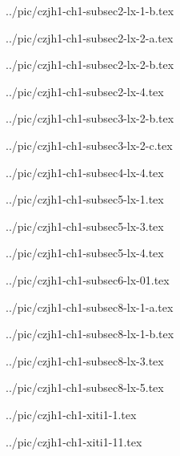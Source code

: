 ../pic/czjh1-ch1-subsec2-lx-1-b.tex



../pic/czjh1-ch1-subsec2-lx-2-a.tex



../pic/czjh1-ch1-subsec2-lx-2-b.tex



../pic/czjh1-ch1-subsec2-lx-4.tex



../pic/czjh1-ch1-subsec3-lx-2-b.tex



../pic/czjh1-ch1-subsec3-lx-2-c.tex



../pic/czjh1-ch1-subsec4-lx-4.tex



../pic/czjh1-ch1-subsec5-lx-1.tex



../pic/czjh1-ch1-subsec5-lx-3.tex



../pic/czjh1-ch1-subsec5-lx-4.tex



../pic/czjh1-ch1-subsec6-lx-01.tex



../pic/czjh1-ch1-subsec8-lx-1-a.tex



../pic/czjh1-ch1-subsec8-lx-1-b.tex



../pic/czjh1-ch1-subsec8-lx-3.tex



../pic/czjh1-ch1-subsec8-lx-5.tex



../pic/czjh1-ch1-xiti1-1.tex



../pic/czjh1-ch1-xiti1-11.tex

